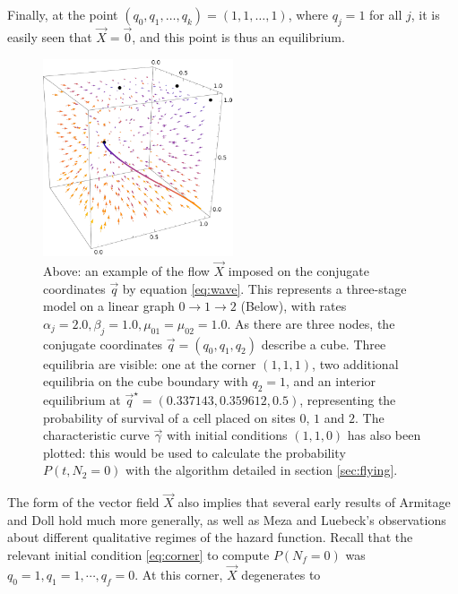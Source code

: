 \documentclass{article}
\begin{document}
Finally, at the point $(q_0, q_1, \dots, q_k) = (1,1,\dots,1)$, where $q_j=1$
for all $j$, it is easily seen that $\vec{X} = \vec{0}$, and this point is thus
an equilibrium.

\begin{figure}
    \includegraphics[width=0.5\textwidth]{figures/flowcube1}
    \caption{\label{fig:cube}Above: an example of the flow $\vec{X}$ imposed on the
    conjugate coordinates $\vec{q}$ by equation \eqref{eq:wave}. This represents
    a three-stage model on a linear graph $0 \rightarrow 1 \rightarrow 2$ (Below), with rates $\alpha_j = 2.0, \beta_j = 1.0, \mu_{01} = \mu_{02} = 1.0$. As
    there are three nodes, the conjugate coordinates $\vec{q}=(q_0,q_1,q_2)$
    describe a cube. Three equilibria are visible: one at the corner $(1,1,1)$,
    two additional equilibria on the cube boundary with $q_2 = 1$, and
    an interior equilibrium at $\vec{q}^\star = (0.337143, 0.359612, 0.5)$, representing the
    probability of survival of a cell placed on sites $0$, $1$ and $2$. The characteristic
    curve $\vec{\gamma}$ with initial conditions $(1,1,0)$ has also been
    plotted: this would be used to calculate the probability $P(t,N_2 = 0)$ with
    the algorithm detailed in section \ref{sec:flying}.}
\end{figure}

The form of the vector field $\vec{X}$ also implies that several early results
of Armitage and Doll hold much more generally, as well as Meza and Luebeck's observations about different qualitative regimes of the hazard function\cite{armitage1957two,meza2008age}. Recall that the relevant initial condition \eqref{eq:corner} to compute $P(N_f = 0)$ was $q_0 = 1, q_1 = 1, \cdots, q_f = 0$.  At this corner, $\vec{X}$ degenerates to
\end{document}
